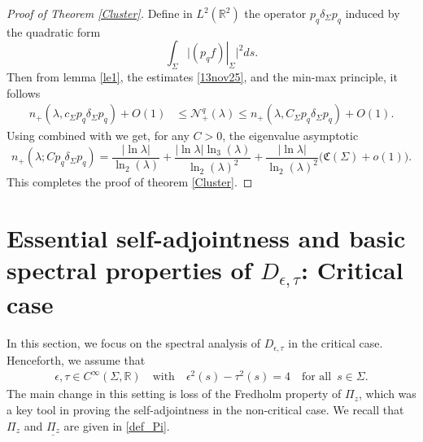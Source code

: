\documentclass[11pt,a4paper,reqno,oneside]{amsproc}
\def \rr {{\mathbb R}}
\numberwithin{equation}{section}
\begin{document}
\begin{proof}[Proof of Theorem \ref{Cluster}]
Define in $L^2(\mathbb R^2)$  the operator  $p_q\delta_\Sigma p_q$ induced by the quadratic form  
\[
\int_\Sigma  \Big|\left.(p_q f)\right|_\Sigma\Big|^2 ds.
\]
Then from lemma \ref{le1}, the estimates \eqref{13nov25},  and  the min-max principle, it follows
\begin{align*}
	n_+(\lambda , c_\Sigma p_q\delta_\Sigma p_q)+O(1)&\leq \mathcal N_+^q(\lambda)\leq  n_+(\lambda , C_\Sigma p_q\delta_\Sigma p_q)+O(1).
	\end{align*}
Using \cite[Proposition 4.1 (ii)]{PushRoz07} combined with \cite[Corollary 5.11]{BrRa20} we get, for any $C>0$, the eigenvalue asymptotic 
\begin{equation*}
n_+(\lambda; C p_q\delta_\Sigma p_q)=
 \frac{|\ln{\lambda}|}{\ln_2(\lambda)} + \frac{|\ln{\lambda}|\ln_3(\lambda)}{\ln_2(\lambda)^2}  +   \frac{|\ln{\lambda}|}{\ln_2(\lambda)^2}\big(\mathfrak C(\Sigma)+o(1)\big).\end{equation*}
This completes the proof of  theorem \ref{Cluster}.
\end{proof}

\section{Essential self-adjointness and basic spectral properties of $D_{\epsilon,\tau}$: Critical case}\label{S6}
In this section,  we focus on the spectral analysis of $D_{\epsilon,\tau}$ in the critical case. Henceforth, we assume that
\begin{align}\label{Assumption}
\epsilon, \tau \in C^\infty(\Sigma,\rr)\quad \text{with}\quad \epsilon^2(s)-\tau^2(s)=4 \quad \text{for all }\, s\in \Sigma. 
\end{align}
The main change in this setting  is loss of the Fredholm property of  $\Pi_z$, which was a key tool in proving the self-adjointness in the non-critical case.  We recall that $\Pi_z$ and $\underline{\Pi_z}$ are given in \eqref{def_Pi}.
\end{document}
